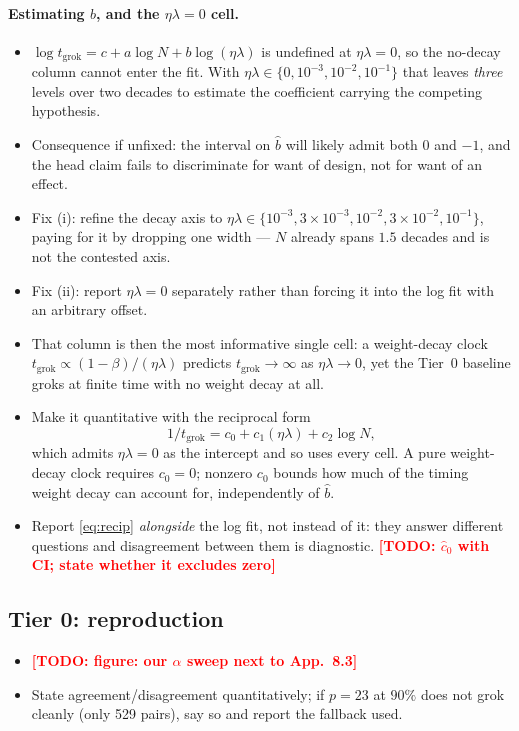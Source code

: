 \documentclass[a4paper,11pt]{article} %
\newcommand{\TODO}[1]{\textcolor{red}{\textbf{[TODO: #1]}}}
\newcommand{\tgrok}{t_{\mathrm{grok}}}
\begin{document}
\paragraph{Estimating $b$, and the $\eta\lambda=0$ cell.}
\begin{itemize}
	\item $\log\tgrok=c+a\log N+b\log(\eta\lambda)$ is undefined at
		$\eta\lambda=0$, so the no-decay column cannot enter the fit. With
		$\eta\lambda\in\{0,10^{-3},10^{-2},10^{-1}\}$ that leaves \emph{three}
		levels over two decades to estimate the coefficient carrying the competing
		hypothesis.
	\item Consequence if unfixed: the interval on $\hat b$ will likely admit both
		$0$ and $-1$, and the head claim fails to discriminate for want of design,
		not for want of an effect.
	\item Fix (i): refine the decay axis to
		$\eta\lambda\in\{10^{-3},3\!\times\!10^{-3},10^{-2},3\!\times\!10^{-2},10^{-1}\}$,
		paying for it by dropping one width --- $N$ already spans $1.5$ decades and
		is not the contested axis.
	\item Fix (ii): report $\eta\lambda=0$ separately rather than forcing it into
		the log fit with an arbitrary offset.
	\item That column is then the most informative single cell: a weight-decay
		clock $\tgrok\propto(1-\beta)/(\eta\lambda)$ \citep{kim2026clock} predicts
		$\tgrok\to\infty$ as $\eta\lambda\to0$, yet the Tier~0 baseline
		\citep[App.~8.3]{kumar2024grokking} groks at finite time with no weight
		decay at all.
	\item Make it quantitative with the reciprocal form
		\begin{equation}
			1/\tgrok = c_0 + c_1(\eta\lambda) + c_2\log N,
			\label{eq:recip}
		\end{equation}
		which admits $\eta\lambda=0$ as the intercept and so uses every cell. A pure
		weight-decay clock requires $c_0=0$; nonzero $c_0$ bounds how much of the
		timing weight decay can account for, independently of $\hat b$.
	\item Report \eqref{eq:recip} \emph{alongside} the log fit, not instead of it:
		they answer different questions and disagreement between them is
		diagnostic. \TODO{$\hat c_0$ with CI; state whether it excludes zero}
\end{itemize}

\subsection{Tier 0: reproduction}
\begin{itemize}
	\item \TODO{figure: our $\alpha$ sweep next to \citet{kumar2024grokking}
		App.~8.3}
	\item State agreement/disagreement quantitatively; if $p=23$ at $90\%$ does
		not grok cleanly (only 529 pairs), say so and report the fallback used.
\end{itemize}
\end{document}

